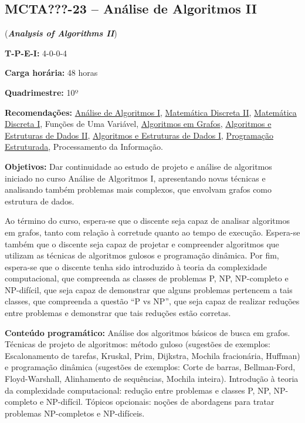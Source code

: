 \documentclass[class=article, crop=false]{standalone}
\begin{document}
\subsection*{MCTA???-23 -- Análise de Algoritmos II}
\label{disc:aaII}

(\textbf{\textit{Analysis of Algorithms II}})

\begin{center}
    \begin{minipage}{0.85\textwidth}
        \textbf{T-P-E-I:} 4-0-0-4
        
        \textbf{Carga horária:} 48 horas
        
        \textbf{Quadrimestre:} 10º
        
        \textbf{Recomendações:} 
        \hyperref[disc:aaI]{Análise de Algoritmos I},
        \hyperref[disc:mdII]{Matemática Discreta II},
        \hyperref[disc:mdI]{Matemática Discreta I},
        Funções de Uma Variável,
        \hyperref[disc:ag]{Algoritmos em Grafos},
        \hyperref[disc:aedII]{Algoritmos e Estruturas de Dados II},
        \hyperref[disc:aedI]{Algoritmos e Estruturas de Dados I},
        \hyperref[disc:pe]{Programação Estruturada},
        Processamento da Informação.
    
    \end{minipage}
\end{center}

\textbf{Objetivos:}
Dar continuidade ao estudo de projeto e análise de algoritmos iniciado no curso
Análise de Algoritmos I, apresentando novas técnicas e analisando também
problemas mais complexos, que envolvam grafos como estrutura de dados.

Ao término do curso, espera-se que o discente seja capaz de analisar algoritmos
em grafos, tanto com relação à corretude quanto ao tempo de execução.
Espera-se também que o discente seja capaz de projetar e compreender algoritmos
que utilizam as técnicas de algoritmos gulosos e programação dinâmica. 
Por fim, espera-se que o discente tenha sido introduzido à teoria da
complexidade computacional, que compreenda as classes de problemas P, NP,
NP-completo e NP-difícil, que seja capaz de demonstrar que alguns problemas
pertencem a tais classes, que compreenda a questão ``P vs NP'', que seja capaz
de realizar reduções entre problemas e demonstrar que tais reduções estão
corretas.

\textbf{Conteúdo programático:}
Análise dos algoritmos básicos de busca em grafos.
Técnicas de projeto de algoritmos: método guloso (sugestões de exemplos: Escalonamento
de tarefas, Kruskal, Prim, Dijkstra, Mochila fracionária, Huffman) e programação 
dinâmica (sugestões de exemplos: Corte de barras, Bellman-Ford, Floyd-Warshall, 
Alinhamento de sequências, Mochila inteira).
Introdução à teoria da complexidade computacional: redução entre problemas e 
classes P, NP, NP-completo e NP-difícil.
Tópicos opcionais: noções de abordagens para tratar problemas NP-completos e NP-difíceis.
\end{document}
